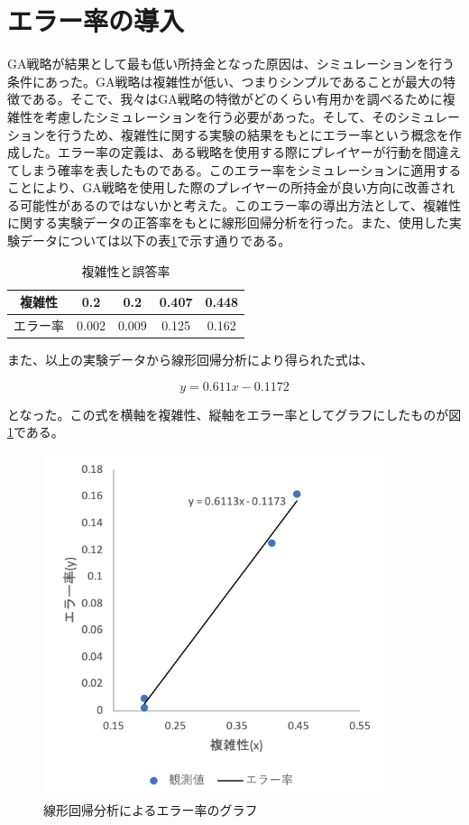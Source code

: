 \section{エラー率の導入}
GA戦略が結果として最も低い所持金となった原因は、シミュレーションを行う条件にあった。GA戦略は複雑性が低い、つまりシンプルであることが最大の特徴である。そこで、我々はGA戦略の特徴がどのくらい有用かを調べるために複雑性を考慮したシミュレーションを行う必要があった。そして、そのシミュレーションを行うため、複雑性に関する実験の結果をもとにエラー率という概念を作成した。エラー率の定義は、ある戦略を使用する際にプレイヤーが行動を間違えてしまう確率を表したものである。このエラー率をシミュレーションに適用することにより、GA戦略を使用した際のプレイヤーの所持金が良い方向に改善される可能性があるのではないかと考えた。このエラー率の導出方法として、複雑性に関する実験データの正答率をもとに線形回帰分析を行った。また、使用した実験データについては以下の表\ref{hoge}で示す通りである。

  \begin{table}[H]
    \centering
    \caption{複雑性と誤答率}
    \begin{tabular}{|c|c|c|c|c|} \hline
      複雑性&0.2&0.2&0.407&0.448 \\ \hline
      エラー率&0.002&0.009&0.125&0.162 \\ \hline
    \end{tabular}
    \label{hoge}
  \end{table}
また、以上の実験データから線形回帰分析により得られた式は、

  \begin{equation}
    y=0.611x - 0.1172
  \end{equation}

となった。この式を横軸を複雑性、縦軸をエラー率としてグラフにしたものが図\ref{hoge2}である。

  \begin{figure}[H]
    \label{hoge2}
    \begin{center}
      \includegraphics[width=10cm]{figure/error_rate.png}
      \caption{線形回帰分析によるエラー率のグラフ}
    \end{center}
  \end{figure}

